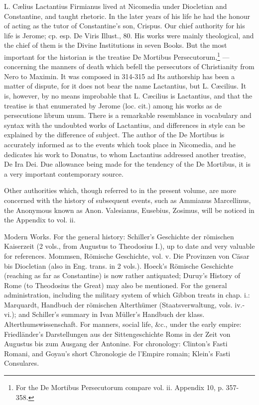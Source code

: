 L. Cælius Lactantius Firmianus lived at Nicomedia under Diocletian and Constantine, and taught rhetoric. In the later years of his life he had the honour of acting as the tutor of Constantine\texthebrew{}’s son, Crispus. Our chief authority for his life is Jerome; cp. esp. De Viris Illust., 80. His works were mainly theological, and the chief of them is the Divine Institutions in seven Books. But the most important for the historian is the treatise De Mortibus Persecutorum,\footnote{For the De Mortibus Persecutorum compare vol. ii. Appendix 10, p. 357-358.} \texthebrew{—} concerning the manners of death which befell the persecutors of Christianity from Nero to Maximin. It was composed in 314-315 ad Its authorship has been a matter of dispute, for it does not bear the name Lactantius, but L. Cæcilius. It is, however, by no means improbable that L. Cæcilius is Lactantius, and that the treatise is that enumerated by Jerome (loc. cit.) among his works as de persecutione librum unum. There is a remarkable resemblance in vocabulary and syntax with the undoubted works of Lactantius, and differences in style can be explained by the difference of subject. The author of the De Mortibus is accurately informed as to the events which took place in Nicomedia, and he dedicates his work to Donatus, to whom Lactantius addressed another treatise, De Ira Dei. Due allowance being made for the tendency of the De Mortibus, it is a very important contemporary source.

Other authorities which, though referred to in the present volume, are more concerned with the history of subsequent events, such as Ammianus Marcellinus, the Anonymous known as Anon. Valesianus, Eusebius, Zosimus, will be noticed in the Appendix to vol. ii.

Modern Works. For the general history: Schiller\texthebrew{}’s Geschichte der römischen Kaiserzeit (2 vols., from Augustus to Theodosius I.), up to date and very valuable for references. Mommsen, Römische Geschichte, vol. v. Die Provinzen von Cäsar bis Diocletian (also in Eng. trans. in 2 vols.). Hoeck\texthebrew{}’s Römische Geschichte (reaching as far as Constantine) is now rather antiquated; Duruy\texthebrew{}’s History of Rome (to Theodosius the Great) may also be mentioned. For the general administration, including the military system of which Gibbon treats in chap. i.: Marquardt, Handbuch der römischen Alterthümer (Staatsverwaltung, vols. iv.-vi.); and Schiller\texthebrew{}’s summary in Ivan Müller\texthebrew{}’s Handbuch der klass. Alterthumswissenschaft. For manners, social life, \&c., under the early empire: Friedländer\texthebrew{}’s Darstellungen aus der Sittengeschichte Roms in der Zeit von Augustus bis zum Ausgang der Antonine. For chronology: Clinton\texthebrew{}’s Fasti Romani, and Goyau\texthebrew{}’s short Chronologie de l\texthebrew{}’Empire romain; Klein\texthebrew{}’s Fasti Consulares.

